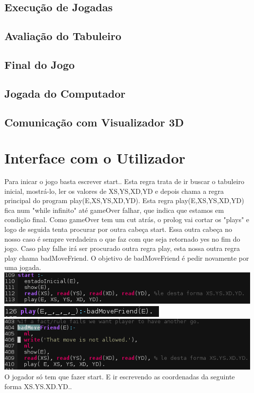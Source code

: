 \documentclass[a4paper]{article}
\begin{document}
\subsection{Execução de Jogadas}

\subsection{Avaliação do Tabuleiro}

\subsection{Final do Jogo}

\subsection{Jogada do Computador}

\subsection{Comunicação com Visualizador 3D}

\section{Interface com o Utilizador}
Para inicar o jogo basta escrever start.. Esta regra trata de ir buscar o tabuleiro inicial, mostrá-lo, ler os valores de XS,YS,XD,YD e depois chama a regra principal do program play(E,XS,YS,XD,YD). Esta regra play(E,XS,YS,XD,YD) fica num "while infinito" até gameOver falhar, que indica que estamos em condição final. Como gameOver tem um cut atrás, o prolog vai cortar os "plays" e logo de seguida tenta procurar por outra cabeça start. Essa outra cabeça no nosso caso é sempre verdadeira o que faz com que seja retornado yes no fim do jogo. Caso play falhe irá ser procurado outra regra play, esta nossa outra regra play chama badMoveFriend. O objetivo de badMoveFriend é pedir novamente por uma jogada.
\\\linebreak
\includegraphics[scale=0.70]{iniciar.png}
\\\linebreak
\includegraphics[scale=0.70]{iniciar1.png}
\\\linebreak
\includegraphics[scale=0.70]{iniciar2.png}
\\\linebreak
O jogador só tem que fazer start. E ir escrevendo as coordenadas da seguinte forma XS.YS.XD.YD..
\end{document}
